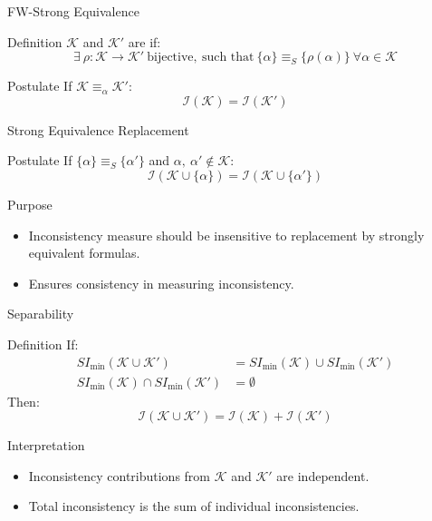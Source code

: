 \begin{frame}{FW-Strong Equivalence}
    \begin{block}{Definition}
        \(\mathcal{K}\) and \(\mathcal{K}'\) are  if:
        \[
            \exists\ \rho : \mathcal{K} \rightarrow \mathcal{K}'\ \text{bijective},\ \text{such that}\ \{\alpha\} \equiv_S \{\rho(\alpha)\}\ \forall \alpha \in \mathcal{K}
        \]
    \end{block}
    \begin{block}{Postulate}
        If \(\mathcal{K} \equiv_{\alpha} \mathcal{K}'\):
        \[
            \mathcal{I}(\mathcal{K}) = \mathcal{I}(\mathcal{K}')
        \]
    \end{block}
\end{frame}

\begin{frame}{Strong Equivalence Replacement}
    \begin{block}{Postulate}
        If \(\{\alpha\} \equiv_S \{\alpha'\}\) and \(\alpha,\ \alpha' \notin \mathcal{K}\):
        \[
            \mathcal{I}(\mathcal{K} \cup \{\alpha\}) = \mathcal{I}(\mathcal{K} \cup \{\alpha'\})
        \]
    \end{block}
    \begin{block}{Purpose}
        \begin{itemize}
            \item Inconsistency measure should be insensitive to replacement by strongly equivalent formulas.
            \item Ensures consistency in measuring inconsistency.
        \end{itemize}
    \end{block}
\end{frame}

\begin{frame}{Separability}
    \begin{block}{Definition}
        If:
        \begin{align*}
            SI_{\min}(\mathcal{K} \cup \mathcal{K}')            & = SI_{\min}(\mathcal{K}) \cup SI_{\min}(\mathcal{K}') \\
            SI_{\min}(\mathcal{K}) \cap SI_{\min}(\mathcal{K}') & = \emptyset
        \end{align*}
        Then:
        \[
            \mathcal{I}(\mathcal{K} \cup \mathcal{K}') = \mathcal{I}(\mathcal{K}) + \mathcal{I}(\mathcal{K}')
        \]
    \end{block}
    \begin{block}{Interpretation}
        \begin{itemize}
            \item Inconsistency contributions from \(\mathcal{K}\) and \(\mathcal{K}'\) are independent.
            \item Total inconsistency is the sum of individual inconsistencies.
        \end{itemize}
    \end{block}
\end{frame}

